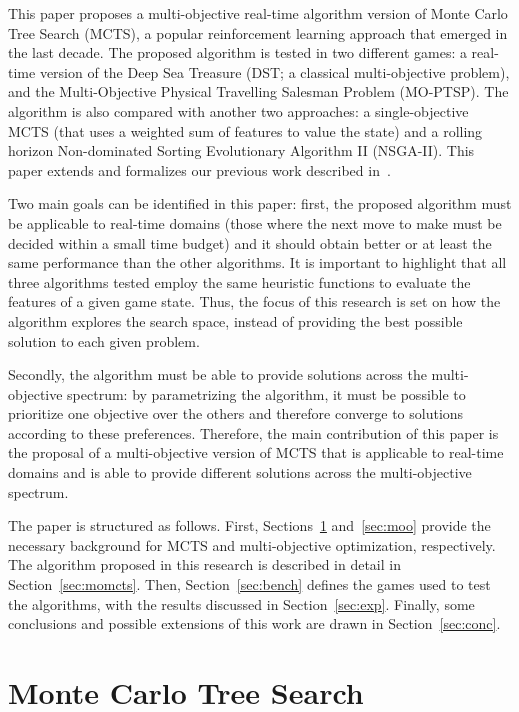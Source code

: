 \documentclass[journal]{IEEEtran}
\begin{document}
This paper proposes a multi-objective real-time algorithm version of Monte Carlo Tree Search (MCTS), a popular reinforcement learning approach that emerged in the last decade. The proposed algorithm is tested in two different games: a real-time version of the Deep Sea Treasure (DST; a classical multi-objective problem), and the Multi-Objective Physical Travelling Salesman Problem (MO-PTSP). The algorithm is also compared with another two approaches: a single-objective MCTS (that uses a weighted sum of features to value the state) and a rolling horizon Non-dominated Sorting Evolutionary Algorithm II (NSGA-II). This paper extends and formalizes our previous work described in~\cite{Perez2013a}.

Two main goals can be identified in this paper: first, the proposed algorithm must be applicable to real-time domains (those where the next move to make must be decided within a small time budget) and it should obtain better or at least the same performance than the other algorithms. It is important to highlight that all three algorithms tested employ the same heuristic functions to evaluate the features of a given game state. Thus, the focus of this research is set on how the algorithm explores the search space, instead of providing the best possible solution to each given problem. 

Secondly, the algorithm must be able to provide solutions across the multi-objective spectrum: by parametrizing the algorithm, it must be possible to prioritize one objective over the others and therefore converge to solutions according to these preferences. Therefore, the main contribution of this paper is the proposal of a multi-objective version of MCTS that is applicable to real-time domains and is able to provide different solutions across the multi-objective spectrum.

The paper is structured as follows. First, Sections~\ref{sec:mcts} and~\ref{sec:moo} provide the necessary background for MCTS and multi-objective optimization, respectively. The algorithm proposed in this research is described in detail in Section~\ref{sec:momcts}. Then, Section~\ref{sec:bench} defines the games used to test the algorithms, with the results discussed in Section~\ref{sec:exp}. Finally, some conclusions and possible extensions of this work are drawn in Section~\ref{sec:conc}.


\section{Monte Carlo Tree Search} \label{sec:mcts}
\end{document}
